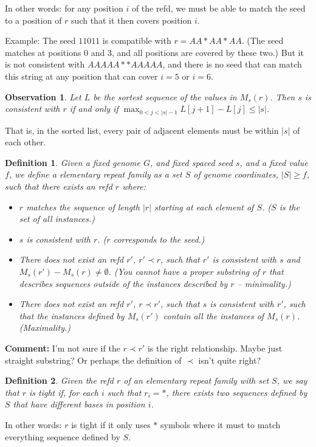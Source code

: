 \documentclass{article}
\newtheorem{definition}{Definition}
\newtheorem{observation}{Observation}
\begin{document}
In other words: for any position $i$ of the refd, we must be able to
match the seed to a position of $r$ such that it then covers position
$i$.

Example: The seed $11011$ is compatible with $r=AA*AA*AA$.  (The seed
matches at positions 0 and 3, and all positions are covered by these
two.)  But it is not consistent with $AAAAA**AAAAA$, and there is no
seed that can match this string at any position that can cover $i=5$
or $i=6$.

\begin{observation}
  Let $L$ be the sortest sequence of the values in $M_s(r)$.  Then $s$
  is consistent with $r$ if and only if $\max_{0 < j < |s|-1} L[j+1]-L[j] \leq |s|$.
\end{observation}
That is, in the sorted list, every pair of adjacent elements must be
within $|s|$ of each other.

\begin{definition}
  Given a fixed genome $G$, and fixed spaced seed
  $s$, and a fixed value $f$, we define a elementary repeat family as
  a set $S$ of genome coordinates, $|S| \geq f$, such that there
  exists an refd $r$ where:
  \begin{itemize}
  \item $r$ matches the sequence of length $|r|$ starting at each
    element of $S$.  ($S$ is the set of all instances.)
  \item $s$ is consistent with $r$.  ($r$ corresponds to the seed.)
  \item There does not exist an refd $r'$, $r' \prec r$,  such that $r'$
    is consistent with $s$ and $M_s(r') - M_s(r) \neq \emptyset$.  (You
    cannot have a proper substring of $r$ that describes sequences
    outside of the instances described by $r$ -- minimality.)
  \item There does not exist an refd $r'$, $r \prec r'$, such that $s$ is consistent
    with $r'$, such that the instances defined by $M_s(r')$ contain all the
    instances of $M_s(r)$.  (Maximality.)
  \end{itemize}
\end{definition}
 {\bf Comment:} I'm not sure if the $r \prec r'$ is the right
 relationship.  Maybe just straight substring?  Or perhaps the
 definition of $\prec$ isn't quite right?


\begin{definition}
Given the refd $r$ of an elementary repeat family with set $S$, we say
that $r$ is {\it tight} if, for each $i$ such that $r_i = *$, there
exists two sequences defined by $S$ that have different bases in
position $i$.
\end{definition}
In other words: $r$ is tight if it only uses $*$ symbols where it must
to match everything sequence defined by $S$.
\end{document}

